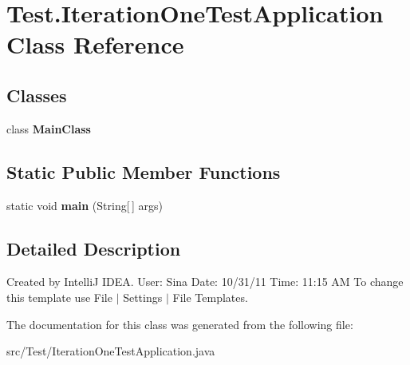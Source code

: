 \section{Test.IterationOneTestApplication Class Reference}
\label{class_test_1_1_iteration_one_test_application}
\subsection*{Classes}
\begin{DoxyCompactItemize}
\item 
class {\bfseries MainClass}
\end{DoxyCompactItemize}
\subsection*{Static Public Member Functions}
\begin{DoxyCompactItemize}
\item 
static void {\bfseries main} (String[$\,$] args)\label{class_test_1_1_iteration_one_test_application_a2439a7a79c575a07b8bd8bde92c2cfaf}

\end{DoxyCompactItemize}


\subsection{Detailed Description}
Created by IntelliJ IDEA. User: Sina Date: 10/31/11 Time: 11:15 AM To change this template use File $|$ Settings $|$ File Templates. 

The documentation for this class was generated from the following file:\begin{DoxyCompactItemize}
\item 
src/Test/IterationOneTestApplication.java\end{DoxyCompactItemize}
